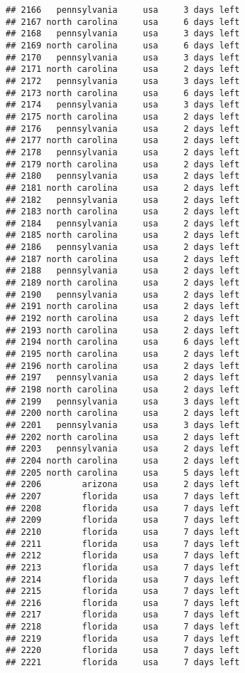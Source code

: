 \documentclass[
]{article}
\begin{document}
\begin{verbatim}
## 2166   pennsylvania     usa     3 days left
## 2167 north carolina     usa     6 days left
## 2168   pennsylvania     usa     3 days left
## 2169 north carolina     usa     6 days left
## 2170   pennsylvania     usa     3 days left
## 2171 north carolina     usa     2 days left
## 2172   pennsylvania     usa     3 days left
## 2173 north carolina     usa     6 days left
## 2174   pennsylvania     usa     3 days left
## 2175 north carolina     usa     2 days left
## 2176   pennsylvania     usa     2 days left
## 2177 north carolina     usa     2 days left
## 2178   pennsylvania     usa     2 days left
## 2179 north carolina     usa     2 days left
## 2180   pennsylvania     usa     2 days left
## 2181 north carolina     usa     2 days left
## 2182   pennsylvania     usa     2 days left
## 2183 north carolina     usa     2 days left
## 2184   pennsylvania     usa     2 days left
## 2185 north carolina     usa     2 days left
## 2186   pennsylvania     usa     2 days left
## 2187 north carolina     usa     2 days left
## 2188   pennsylvania     usa     2 days left
## 2189 north carolina     usa     2 days left
## 2190   pennsylvania     usa     2 days left
## 2191 north carolina     usa     2 days left
## 2192 north carolina     usa     2 days left
## 2193 north carolina     usa     2 days left
## 2194 north carolina     usa     6 days left
## 2195 north carolina     usa     2 days left
## 2196 north carolina     usa     2 days left
## 2197   pennsylvania     usa     2 days left
## 2198 north carolina     usa     2 days left
## 2199   pennsylvania     usa     3 days left
## 2200 north carolina     usa     2 days left
## 2201   pennsylvania     usa     3 days left
## 2202 north carolina     usa     2 days left
## 2203   pennsylvania     usa     2 days left
## 2204 north carolina     usa     2 days left
## 2205 north carolina     usa     5 days left
## 2206        arizona     usa     2 days left
## 2207        florida     usa     7 days left
## 2208        florida     usa     7 days left
## 2209        florida     usa     7 days left
## 2210        florida     usa     7 days left
## 2211        florida     usa     7 days left
## 2212        florida     usa     7 days left
## 2213        florida     usa     7 days left
## 2214        florida     usa     7 days left
## 2215        florida     usa     7 days left
## 2216        florida     usa     7 days left
## 2217        florida     usa     7 days left
## 2218        florida     usa     7 days left
## 2219        florida     usa     7 days left
## 2220        florida     usa     7 days left
## 2221        florida     usa     7 days left

\end{verbatim}
\end{document}
